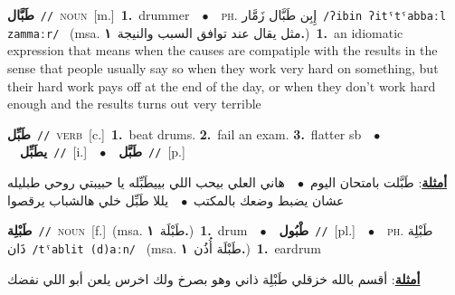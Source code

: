 \documentclass[10pt,a4paper,twoside]{article} %
\begin{document}
\begin{multicols}{2}
{{{{{{{{{{{{{\setlength\topsep{0pt}\textbf{\foreignlanguage{arabic}{طَبَّال}}\ {\color{gray}\texttt{//}\color{black}}\ \textsc{noun}\ [m.]\ \textbf{1.}~drummer\ \ $\bullet$\ \ \textsc{ph.} \color{gray} \foreignlanguage{arabic}{إِبِن طَبَّال زَمَّار}\color{black}\ {\color{gray}\texttt{/{\sffamily ʔibin ʔitˤtˤabbaːl zammaːr}/}\color{black}}\ \color{gray} (msa. \foreignlanguage{arabic}{مثل يقال عند توافق السبب والنيجة}~\foreignlanguage{arabic}{\textbf{١.}})\color{black}\ \textbf{1.}~an idiomatic expression that means  when the causes are compatiple with the results in the sense that people usually say so when they work very hard on something, but their hard work pays off at the end of the day, or when they don't work hard enough and the results turns out very terrible\ 

{\setlength\topsep{0pt}\textbf{\foreignlanguage{arabic}{طَبِّل}}\ {\color{gray}\texttt{//}\color{black}}\ \textsc{verb}\ [c.]\ \textbf{1.}~beat drums.  \textbf{2.}~fail an exam.  \textbf{3.}~flatter sb\ \ $\bullet$\ \ \setlength\topsep{0pt}\textbf{\foreignlanguage{arabic}{يطَبِّل}}\ {\color{gray}\texttt{//}\color{black}}\ [i.]\ \ $\bullet$\ \ \setlength\topsep{0pt}\textbf{\foreignlanguage{arabic}{طَبَّل}}\ {\color{gray}\texttt{//}\color{black}}\ [p.]\  \begin{flushright}\color{gray}\foreignlanguage{arabic}{\textbf{\underline{\foreignlanguage{arabic}{أمثلة}}}: طَبَّلت بامتحان اليوم\ $\bullet$\ \  هاني العلي بيحب اللي بييطَبِّله يا حبيبتي روحي طبليله عشان يضبط وضعك بالمكتب\ $\bullet$\ \  يللا طَبِّل خلي هالشباب يرقصوا}\end{flushright}\color{black}} \vspace{2mm}

{\setlength\topsep{0pt}\textbf{\foreignlanguage{arabic}{طَبْلِة}}\ {\color{gray}\texttt{//}\color{black}}\ \textsc{noun}\ [f.]\ \color{gray}(msa. \foreignlanguage{arabic}{طَبْلَة}~\foreignlanguage{arabic}{\textbf{١.}})\color{black}\ \textbf{1.}~drum\ \ $\bullet$\ \ \setlength\topsep{0pt}\textbf{\foreignlanguage{arabic}{طْبُول}}\ {\color{gray}\texttt{//}\color{black}}\ [pl.]\ \ $\bullet$\ \ \textsc{ph.} \color{gray} \foreignlanguage{arabic}{طَبْلِة ذَان}\color{black}\ {\color{gray}\texttt{/{\sffamily tˤablit (d)aːn}/}\color{black}}\ \color{gray} (msa. \foreignlanguage{arabic}{طَبْلَة أُذُن}~\foreignlanguage{arabic}{\textbf{١.}})\color{black}\ \textbf{1.}~eardrum\  \begin{flushright}\color{gray}\foreignlanguage{arabic}{\textbf{\underline{\foreignlanguage{arabic}{أمثلة}}}: أقسم بالله خزقلي طَبْلِة ذاني وهو بصرخ ولك اخرس يلعن أبو اللي نفضك}\end{flushright}\color{black}} \vspace{2mm}

}}}}}}}}}}}}}
\end{multicols}
\end{document}
